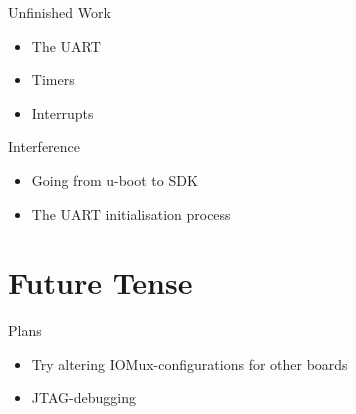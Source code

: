 \documentclass[9pt]{beamer}
\begin{document}
\begin{frame}{Unfinished Work}
\pause
 \begin{itemize}
 \item The UART
\pause
 \item Timers
\pause
 \item Interrupts
 \end{itemize}
\end{frame}

\begin{frame}{Interference}
 \begin{itemize}
 \item Going from u-boot to SDK
\pause
 \item The UART initialisation process
 \end{itemize}
\end{frame}

\section{Future Tense}

\begin{frame}{Plans}
 \begin{itemize}
 \item Try altering IOMux-configurations for other boards
\pause
 \item JTAG-debugging
 \end{itemize}
\end{frame}
\end{document}
